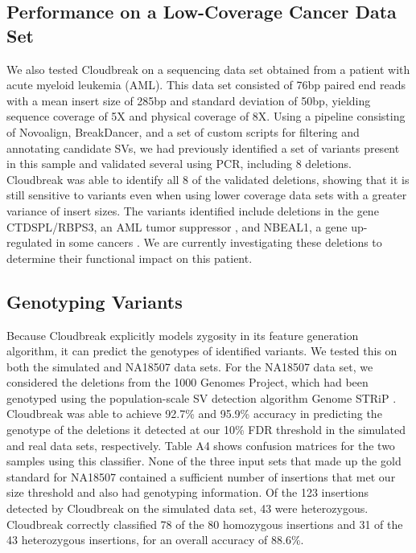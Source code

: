 \documentclass[10pt]{bmc_article}
\newenvironment{bmcformat}{\fussy\setboolean{publ}{true}}{\fussy}
\begin{document}
\begin{bmcformat}
\subsection*{Performance on a Low-Coverage Cancer Data Set}

We also tested Cloudbreak on a sequencing data set obtained from a patient with acute myeloid leukemia (AML). This data set consisted of 76bp paired end reads with a mean insert size of 285bp and standard deviation of 50bp, yielding sequence coverage of 5X and physical coverage of 8X. Using a pipeline consisting of Novoalign, BreakDancer, and a set of custom scripts for filtering and annotating candidate SVs, we had previously identified a set of variants present in this sample and validated several using PCR, including 8 deletions. Cloudbreak was able to identify all 8 of the validated deletions, showing that it is still sensitive to variants even when using lower coverage data sets with a greater variance of insert sizes. The variants identified include deletions in the gene CTDSPL/RBPS3, an AML tumor suppressor \cite{Zheng:2012kk}, and NBEAL1, a gene up-regulated in some cancers \cite{Chen:2004jo}. We are currently investigating these deletions to determine their functional impact on this patient. 

\subsection*{Genotyping Variants}

Because Cloudbreak explicitly models zygosity in its feature generation algorithm, it can predict the genotypes of identified variants. We tested this on both the simulated and NA18507 data sets. For the NA18507 data set, we considered the deletions from the 1000 Genomes Project, which had been genotyped using the population-scale SV detection algorithm Genome STRiP \cite{Handsaker:2011ki}. Cloudbreak was able to achieve 92.7\% and 95.9\% accuracy in predicting the genotype of the deletions it detected at our 10\% FDR threshold in the simulated and real data sets, respectively. Table A4 shows confusion matrices for the two samples using this classifier. None of the three input sets that made up the gold standard for NA18507 contained a sufficient number of insertions that met our size threshold and also had genotyping information. Of the 123 insertions detected by Cloudbreak on the simulated data set, 43 were heterozygous. Cloudbreak correctly classified 78 of the 80 homozygous insertions and 31 of the 43 heterozygous insertions, for an overall accuracy of 88.6\%.


\end{bmcformat}
\end{document}

